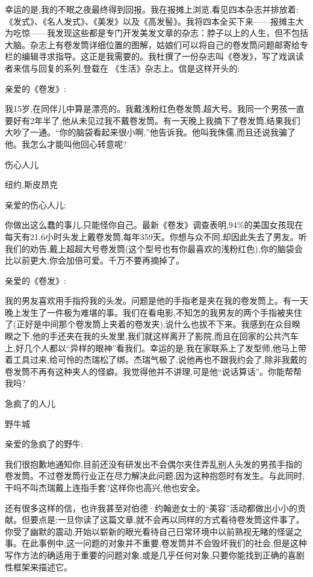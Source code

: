幸运的是,我的不眠之夜最终得到回报。我在报摊上浏览,看见四本杂志并排放着:《发式》、《名人发式》、《美发》以及《高发髻》。我将四本全买下来——报摊主大为吃惊——我发现这些都是专门开发美发文章的杂志：脖子以上的人生，但不包括大脑。杂志上有卷发筒详细位置的图解，姑娘们可以将自己的卷发筒问题邮寄给专栏的编辑寻求指导。这正是我需要的。我杜撰了一份杂志叫《卷发》，写了戏讽读者来信与回复的系列,登载在 《生活》杂志上。信是这样开头的:

亲爱的《卷发》:

我15岁,在同伴儿中算是漂亮的。我戴浅粉红色卷发筒,超大号。我同一个男孩一直要好有2年半了,他从未见过我不戴卷发筒。有一天晚上我摘下了卷发筒,结果我们大吵了一通。“你的脑袋看起来很小啊,”他告诉我。他叫我侏儒,而且还说我骗了他。我怎么才能叫他回心转意呢?

伤心人儿

纽约,斯皮昂克

亲爱的伤心人儿:

你做出这么蠢的事儿,只能怪你自己。最新《卷发》调查表明,94\%的美国女孩现在每天有21.6小时头发上戴卷发筒,每年359天。你想与众不同,却因此失去了男友。听我们的劝告,戴上超超大号卷发筒(这个型号也有你最喜欢的浅粉红色),你的脑袋会比以前更大,你会加倍可爱。千万不要再摘掉了。

亲爱的《卷发》:

我的男友喜欢用手指捋我的头发。问题是他的手指老是夹在我的卷发筒上。有一天晚上发生了一件极为难堪的事。我们在看电影,不知怎的我男友的两个手指被夹住了(正好是中间那个卷发筒上夹着的卷发夹),说什么也拔不下来。我感到在众目睽睽之下,他的手还夹在我的头发里,我们就这样离开了影院,而且在回家的公共汽车上,好几个人都以“异样的眼神”看我们。幸运的是,我在家联系上了发型师,他马上带着工具过来,给可怜的杰瑞松了绑。杰瑞气极了,说他再也不跟我约会了,除非我戴的卷发筒不再有这种夹人的怪癖。我觉得他并不讲理,可是他“说话算话”。你能帮帮我吗?

急疯了的人儿

野牛城

亲爱的急疯了的野牛:

我们很抱歉地通知你,目前还没有研发出不会偶尔夹住弄乱别人头发的男孩手指的卷发筒。不过卷发筒行业正在尽力解决此问题,因为这种抱怨时有发生。与此同时,干吗不叫杰瑞戴上连指手套?这样你也高兴,他也安全。

还有很多这样的信，也许我甚至对伯德·约翰逊女士的“美容”活动都做出小小的贡献。但要点是:一旦你读了这篇文章,就不会再以同样的方式看待卷发筒这件事了。你受了幽默的震动,开始以崭新的眼光看待自己日常环境中以前熟视无睹的怪诞之事。在此事例中,这一问题的对象并不重要,卷发筒并不会毁坏我们的社会,但是这种写作方法的确适用于重要的问题对象,或是几乎任何对象,只要你能找到正确的喜剧性框架来描述它。

